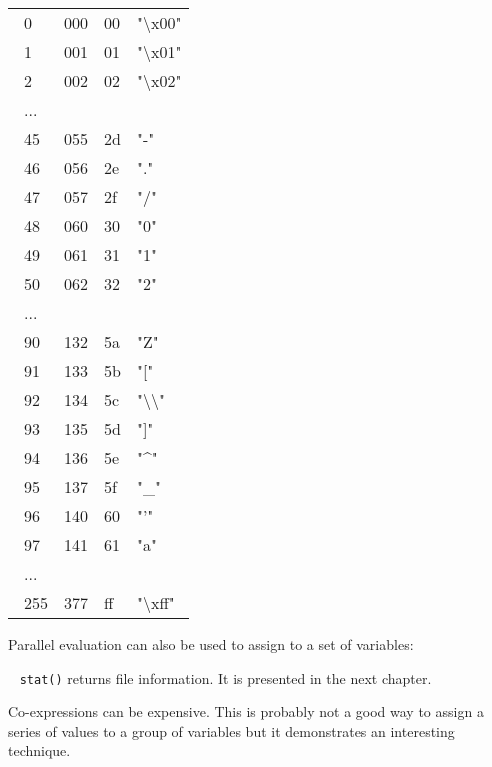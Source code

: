 \begin{flushleft}
\begin{xtabular}{m{2.00cm}m{2.00cm}m{2.00cm}m{2.00cm}}
\ 0  &  000  &  00  &  "{\textbackslash}x00"\\
\ 1  &  001  &  01  &  "{\textbackslash}x01"\\
\ 2  &  002  &  02  &  "{\textbackslash}x02"\\
\ ...\\
\ 45  &  055  &  2d  &  "-"\\
\ 46  &  056  &  2e  &  "."\\
\ 47  &  057  &  2f  &  "/"\\
\ 48  &  060  &  30  &  "0"\\
\ 49  &  061  &  31  &  "1"\\
\ 50  &  062  &  32  &  "2"\\
\ ...\\
\ 90  &  132  &  5a  &  "Z"\\
\ 91  &  133  &  5b  &  "["\\
\ 92  &  134  &  5c  &  "{\textbackslash}{\textbackslash}"\\
\ 93  &  135  &  5d  &  "]"\\
\ 94  &  136  &  5e  &  "\^{}"\\
\ 95  &  137  &  5f  &  "\_"\\
\ 96  &  140  &  60  &  "'"\\
\ 97  &  141  &  61  &  "a"\\
\ ...\\
\ 255  &  377  &  ff  &  "{\textbackslash}xff"\\
\end{xtabular}
\end{flushleft}

\noindent
Parallel evaluation can also be used to assign to a set of variables:


\medskip{}\ {\sffamily
\texttt{stat()} returns file information. It is presented in the next chapter.}\medskip

\noindent
Co-expressions can be expensive. This is probably not a
good way to assign a series of values to a group of variables but it
demonstrates an interesting technique.

